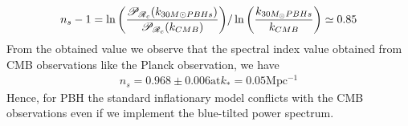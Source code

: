 \begin{align}
    n_s - 1 = \ln \qty(\frac{\mathcal{P}_{\mathcal{R}_c}(k_{30M{\odot} PBHs})}{\mathcal{P}_{\mathcal{R}_c}(k_{CMB})})/ \ln\qty(\frac{k_{30M_{\odot} PBHs}}{k_{CMB}}) \simeq 0.85 \label{3.41}
\end{align}
From the obtained value we observe that the spectral index value obtained from CMB observations like the Planck observation, we have 
\begin{align}
    n_s = 0.968 \pm 0.006 \text{at} k_{*} = 0.05 \mathrm{Mpc^{-1}}\label{3.42}
\end{align}
Hence, for PBH the standard inflationary model conflicts with the CMB observations even if we implement the blue-tilted power spectrum.




